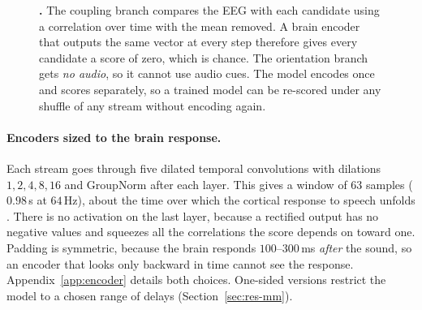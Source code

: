 \begin{figure}[t]
{}
\caption{\textbf{\merit{}.} The coupling branch compares the EEG with each
candidate using a correlation over time with the mean removed. A brain encoder
that outputs the same vector at every step therefore gives every candidate a
score of zero, which is chance. The orientation branch gets \emph{no audio}, so
it cannot use audio cues. The model encodes once and scores separately, so a
trained model can be re-scored under any shuffle of any stream without encoding
again.}
\label{fig:arch}
\end{figure}

\paragraph{Encoders sized to the brain response.}
Each stream goes through five dilated temporal convolutions
\citep{yu2016dilated} with dilations $1,2,4,8,16$ and GroupNorm
\citep{wu2018groupnorm} after each layer. This gives a window of $63$ samples
($0.98$\,s at $64$\,Hz), about the time over which the cortical response to
speech unfolds \citep{lalor2009}. There is no activation on the last layer,
because a rectified output has no negative values and squeezes all the
correlations the score depends on toward one. Padding is symmetric, because the
brain responds $100$--$300$\,ms \emph{after} the sound, so an encoder that looks
only backward in time cannot see the response. Appendix~\ref{app:encoder}
details both choices. One-sided versions restrict the model to a chosen range of
delays (Section~\ref{sec:res-mm}).

